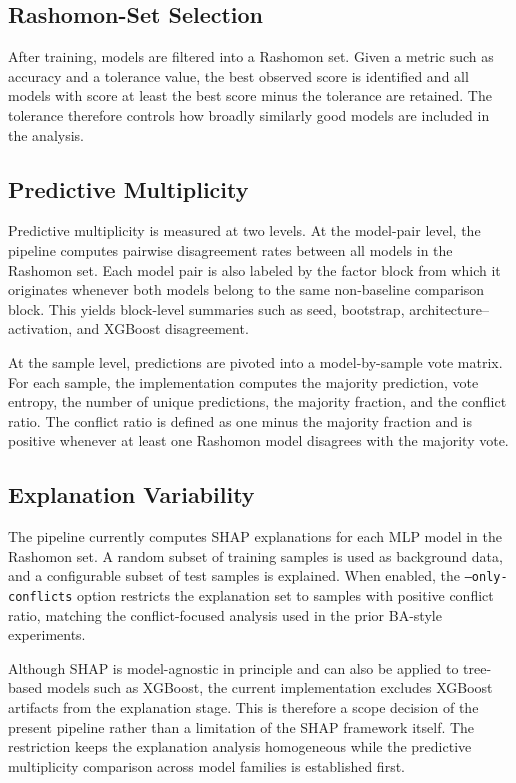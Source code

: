 \subsection{Rashomon-Set Selection}

After training, models are filtered into a Rashomon set. Given a metric such as accuracy and a tolerance value, the best observed score is identified and all models with score at least the best score minus the tolerance are retained. The tolerance therefore controls how broadly similarly good models are included in the analysis.

\subsection{Predictive Multiplicity}

Predictive multiplicity is measured at two levels. At the model-pair level, the pipeline computes pairwise disagreement rates between all models in the Rashomon set. Each model pair is also labeled by the factor block from which it originates whenever both models belong to the same non-baseline comparison block. This yields block-level summaries such as seed, bootstrap, architecture--activation, and XGBoost disagreement.

At the sample level, predictions are pivoted into a model-by-sample vote matrix. For each sample, the implementation computes the majority prediction, vote entropy, the number of unique predictions, the majority fraction, and the conflict ratio. The conflict ratio is defined as one minus the majority fraction and is positive whenever at least one Rashomon model disagrees with the majority vote.

\subsection{Explanation Variability}

The pipeline currently computes SHAP explanations for each MLP model in the Rashomon set. A random subset of training samples is used as background data, and a configurable subset of test samples is explained. When enabled, the \texttt{--only-conflicts} option restricts the explanation set to samples with positive conflict ratio, matching the conflict-focused analysis used in the prior BA-style experiments.

Although SHAP is model-agnostic in principle and can also be applied to tree-based models such as XGBoost, the current implementation excludes XGBoost artifacts from the explanation stage. This is therefore a scope decision of the present pipeline rather than a limitation of the SHAP framework itself. The restriction keeps the explanation analysis homogeneous while the predictive multiplicity comparison across model families is established first.

